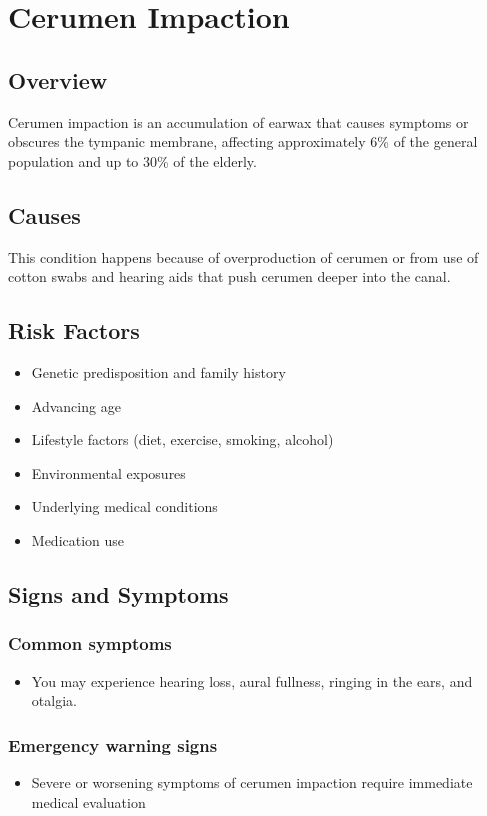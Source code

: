 \chapter{Cerumen Impaction}
\label{sec:Cerumen Impaction}

\section{Overview}
Cerumen impaction is an accumulation of earwax that causes symptoms or obscures the tympanic membrane, affecting approximately 6\% of the general population and up to 30\% of the elderly.
\section{Causes}
This condition happens because of overproduction of cerumen or from use of cotton swabs and hearing aids that push cerumen deeper into the canal.     
\section{Risk Factors}

\begin{itemize}[noitemsep]
  \item Genetic predisposition and family history
  \item Advancing age
  \item Lifestyle factors (diet, exercise, smoking, alcohol)
  \item Environmental exposures
  \item Underlying medical conditions
  \item Medication use
\end{itemize}
\section{Signs and Symptoms}

\subsection{Common symptoms}
\begin{itemize}[noitemsep]
  \item You may experience hearing loss, aural fullness, ringing in the ears, and otalgia. 
  \end{itemize}

\subsection{Emergency warning signs}
\begin{itemize}[noitemsep]
  \item Severe or worsening symptoms of cerumen impaction require immediate medical evaluation
\end{itemize}
